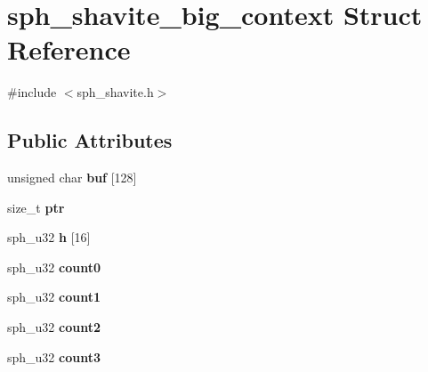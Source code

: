 \hypertarget{structsph__shavite__big__context}{}\section{sph\+\_\+shavite\+\_\+big\+\_\+context Struct Reference}
\label{structsph__shavite__big__context}


{\ttfamily \#include $<$sph\+\_\+shavite.\+h$>$}

\subsection*{Public Attributes}
\begin{DoxyCompactItemize}
\item 
\mbox{\label{structsph__shavite__big__context_a8de5b007c608c41a1f10ccc5e62c71d3}} 
unsigned char {\bfseries buf} \mbox{[}128\mbox{]}
\item 
\mbox{\label{structsph__shavite__big__context_ad70355ab4dd9a6f80191802977897a70}} 
size\+\_\+t {\bfseries ptr}
\item 
\mbox{\label{structsph__shavite__big__context_af2b5cda92791e0180ccca0108cbcdc40}} 
sph\+\_\+u32 {\bfseries h} \mbox{[}16\mbox{]}
\item 
\mbox{\label{structsph__shavite__big__context_afecac1e6c2afed7a9a43bf146f74480d}} 
sph\+\_\+u32 {\bfseries count0}
\item 
\mbox{\label{structsph__shavite__big__context_a456e003be27a3f6e27b467e0f8f69b41}} 
sph\+\_\+u32 {\bfseries count1}
\item 
\mbox{\label{structsph__shavite__big__context_a80e43e7ce1fa3ae38d77c8416aedd787}} 
sph\+\_\+u32 {\bfseries count2}
\item 
\mbox{\label{structsph__shavite__big__context_ae4e9d166fd7a40f1a1a43d4861779b9a}} 
sph\+\_\+u32 {\bfseries count3}
\end{DoxyCompactItemize}


